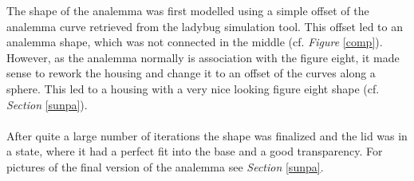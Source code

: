 \documentclass[a4paper,9pt]{article}
\begin{document}
    \label{print}
    \begin{multicols}{2}
    The shape of the analemma was first modelled using a simple offset of the analemma curve retrieved from the ladybug simulation tool. This offset led to an analemma shape, which was not connected in the middle (cf. \textit{Figure} \ref{comp}). However, as the analemma normally is association with the figure eight, it made sense to rework the housing and change it to an offset of the curves along a sphere. This led to a housing with a very nice looking figure eight shape (cf. \textit{Section} \ref{sunpa}).\\
    \\
    After quite a large number of iterations the shape was finalized and the lid was in a state, where it had a perfect fit into the base and a good transparency. For pictures of the final version of the analemma see \textit{Section} \ref{sunpa}.
\end{multicols}
\end{document}
